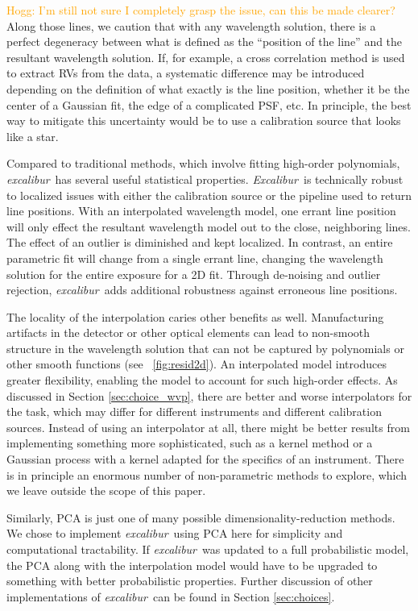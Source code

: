 \documentclass[modern]{aastex63}
\newcommand{\project}[1]{\textsl{#1}}
\newcommand{\name}{\project{excalibur}}
\newcommand{\Name}{\project{Excalibur}}
\newcommand{\lz}[1]{\textcolor{orange}{#1}}
\begin{document}
\lz{Hogg: I'm still not sure I completely grasp the issue, can this be made clearer?}
Along those lines, we caution that with any wavelength solution, there is a perfect degeneracy between what is defined as the ``position of the line'' and the resultant wavelength solution.  If, for example, a cross correlation method is used to extract RVs from the data, a systematic difference may be introduced depending on the definition of what exactly is the line position, whether it be the center of a Gaussian fit, the edge of a complicated PSF, etc.  In principle, the best way to mitigate this uncertainty would be to use a calibration source that looks like a star.

Compared to traditional methods, which involve fitting high-order polynomials, \name\ has several useful statistical properties.  \Name\ is technically robust to localized issues with either the calibration source or the pipeline used to return line positions.  With an interpolated wavelength model, one errant line position will only effect the resultant wavelength model out to the close, neighboring lines.  The effect of an outlier is diminished and kept localized.  In contrast, an entire parametric fit will change from a single errant line, changing the wavelength solution for the entire exposure for a 2D fit.  Through de-noising and outlier rejection, \name\ adds additional robustness against erroneous line positions.

The locality of the interpolation caries other benefits as well.  Manufacturing artifacts in the detector or other optical elements can lead to non-smooth structure in the wavelength solution that can not be captured by polynomials or other smooth functions (see \figurename~\ref{fig:resid2d}).  An interpolated model introduces greater flexibility, enabling the model to account for such high-order effects.  As discussed in Section \ref{sec:choice_wvp}, there are better and worse interpolators for the task, which may differ for different instruments and different calibration sources.  Instead of using an interpolator at all, there might be better results from implementing something more sophisticated, such as a kernel method or a Gaussian process with a kernel adapted for the specifics of an instrument.  There is in principle an enormous number of non-parametric methods to explore, which we leave outside the scope of this paper.

Similarly, PCA is just one of many possible dimensionality-reduction methods.  We chose to implement \name\ using PCA here for simplicity and computational tractability.  If \name\ was updated to a full probabilistic model, the PCA along with the interpolation model would have to be upgraded to something with better probabilistic properties.  Further discussion of other implementations of \name\ can be found in Section \ref{sec:choices}.
\end{document}
